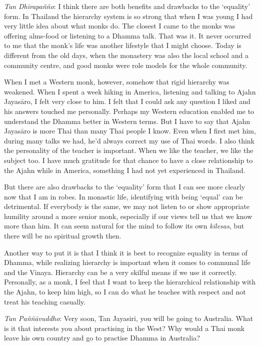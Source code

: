 \emph{Tan Dhīrapañño}: I think there are both benefits and drawbacks to
the `equality' form. In Thailand the hierarchy system is so strong that
when I was young I had very little idea about what monks do. The closest
I came to the monks was offering alms-food or listening to a Dhamma
talk. That was it. It never occurred to me that the monk's life was
another lifestyle that I might choose. Today is different from the old
days, when the monastery was also the local school and a community
centre, and good monks were role models for the whole community. 

When I met a Western monk, however, somehow that rigid hierarchy was
weakened. When I spent a week hiking in America, listening and talking
to Ajahn Jayasāro, I felt very close to him. I felt that I could ask any
question I liked and his answers touched me personally. Perhaps my
Western education enabled me to understand the Dhamma better in Western
terms. But I have to say that Ajahn Jayasāro is more Thai than many Thai
people I know. Even when I first met him, during many talks we had, he'd
always correct my use of Thai words. I also think the personality of the
teacher is important. When we like the teacher, we like the subject too. 
I have much gratitude for that chance to have a close relationship to
the Ajahn while in America, something I had not yet experienced in
Thailand. 

But there are also drawbacks to the `equality' form that I can see more
clearly now that I am in robes. In monastic life, identifying with being
`equal' can be detrimental. If everybody is the same, we may not listen
to or show appropriate humility around a more senior monk, especially if
our views tell us that we know more than him. It can seem natural for
the mind to follow its own \emph{kilesas}, but there will be no
spiritual growth then.

Another way to put it is that I think it is best
to recognize equality in terms of Dhamma, while realizing hierarchy is
important when it comes to communal life and the Vinaya. Hierarchy can
be a very skilful means if we use it correctly. Personally, as a monk, I
feel that I want to keep the hierarchical relationship with the Ajahn, 
to keep him high, so I can do what he teaches with respect and not treat
his teaching casually. 

\emph{Tan Paññāvuddho}: Very soon, Tan Jayasiri, you will be going to
Australia. What is it that interests you about practising in the West? 
Why would a Thai monk leave his own country and go to practise Dhamma in
Australia? 

